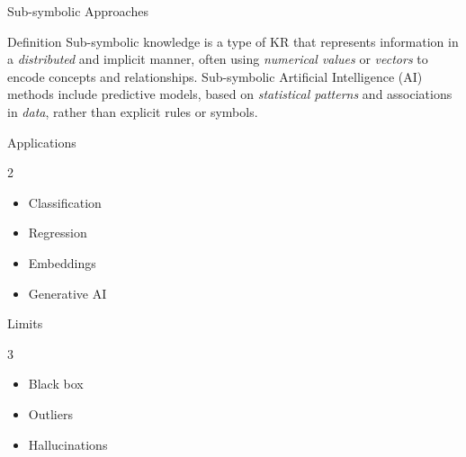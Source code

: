 \documentclass[presentation]{beamer}\mode<presentation>{\usetheme{AMSBolognaFC}}
\begin{document}
\begin{frame}[c]{Sub-symbolic Approaches~}
    \begin{exampleblock}{Definition}
        Sub-symbolic knowledge is a type of KR that represents information in a \emph{distributed} and implicit manner,
        often using \emph{numerical values} or \emph{vectors} to encode concepts and relationships.
        Sub-symbolic Artificial Intelligence (AI) methods include predictive models, based on \emph{statistical patterns} and associations in \emph{data}, rather than explicit rules or symbols.
    \end{exampleblock}

    \begin{alertblock}{Applications}
        \begin{multicols}{2}
            {\small
                \begin{itemize}
                    \item Classification
                    \item Regression
                    \item Embeddings
                    \item Generative AI
                \end{itemize}
            }
        \end{multicols}
    \end{alertblock}

    \begin{block}{Limits}
        \begin{multicols}{3}
            {\small
                \begin{itemize}
                    \item Black box
                    \item Outliers
                    \item Hallucinations
                \end{itemize}
            }
        \end{multicols}
    \end{block}

\end{frame}
\end{document}
